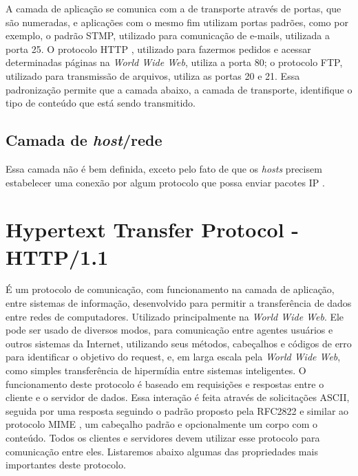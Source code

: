 A camada de aplicação se comunica com a de transporte através de portas, que são numeradas, e aplicações com o mesmo fim utilizam portas padrões, como por exemplo, o padrão STMP, utilizado para comunicação de e-mails, utilizada a porta 25. O protocolo HTTP \cite{rfc2616_http1.1}, utilizado para fazermos pedidos e acessar determinadas páginas na \textit{World Wide Web}, utiliza a porta 80; o protocolo FTP, utilizado para transmissão de arquivos, utiliza as portas 20 e 21. Essa padronização permite que a camada abaixo, a camada de transporte, identifique o tipo de conteúdo que está sendo transmitido.


\subsection{Camada de \textit{host}/rede}
Essa camada não é bem definida, exceto pelo fato de que os \textit{hosts} precisem estabelecer uma conexão por algum protocolo que possa enviar pacotes IP \cite{tanenbaumredes}.


\section{Hypertext Transfer Protocol - HTTP/1.1}
É um protocolo de comunicação, com funcionamento na camada de aplicação, entre sistemas de informação, desenvolvido para permitir a transferência de dados entre redes de computadores. Utilizado principalmente na \textit{World Wide Web}.
Ele pode ser usado de diversos modos, para comunicação entre agentes usuários e outros sistemas da Internet, utilizando seus métodos, cabeçalhos e códigos de erro para identificar o objetivo do request, e, em larga escala pela \textit{World Wide Web}, como simples transferência de hipermídia entre sistemas inteligentes.
O funcionamento deste protocolo é baseado em requisições e respostas entre o cliente e o servidor de dados. Essa interação é feita através de solicitações ASCII, seguida por uma resposta seguindo o padrão proposto pela RFC2822 \cite{rfc2822_resnick_int_message_format} e similar ao protocolo MIME \cite{rfc2045_freed_borestein_mime}, um cabeçalho padrão e opcionalmente um corpo com o conteúdo. Todos os clientes e servidores devem utilizar esse protocolo para comunicação entre eles. Listaremos abaixo algumas das propriedades mais importantes deste protocolo.


